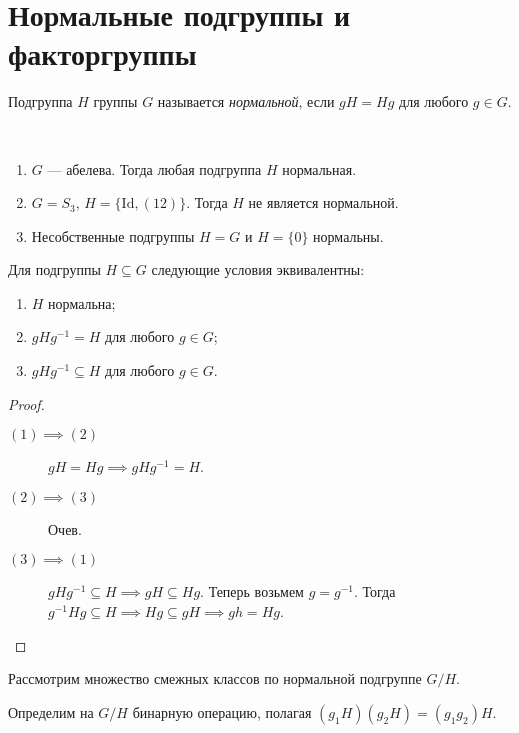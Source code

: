 \section{Нормальные подгруппы и факторгруппы}

\begin{definition}
    Подгруппа $H$ группы $G$ называется \textit{нормальной}, если $gH = Hg$ для любого $g \in G$.
\end{definition}

\begin{example}~
    \begin{enumerate}
    \item $G$ --- абелева. Тогда любая подгруппа $H$ нормальная.
    \item $G = S_3$, $H = \{\mathrm{Id}, (12)\}$. Тогда $H$ не является нормальной.
    \item Несобственные подгруппы $H = G$ и $H = \{0\}$ нормальны.
    \end{enumerate}
\end{example}

\begin{proposal}
    Для подгруппы $H \subseteq G$ следующие условия эквивалентны:
    \begin{enumerate}
    \item $H$ нормальна;
    \item $g H g^{-1} = H$ для любого $g \in G$;
    \item $g H g^{-1} \subseteq H$ для любого $g \in G$. 
    \end{enumerate}
\end{proposal}

\begin{proof}~
    \begin{description}
        \item[$(1) \implies (2)$] $gH = Hg \implies gHg^{-1} = H$.
        \item[$(2) \implies (3)$] Очев.
        \item[$(3) \implies (1)$] $gHg^{-1} \subseteq H \implies gH \subseteq Hg$. Теперь возьмем $g = g^{-1}$. Тогда $g^{-1} H g \subseteq H \implies Hg \subseteq gH \implies gh = Hg$.
            \qedhere
    \end{description}
\end{proof}

\bigskip
Рассмотрим множество смежных классов по нормальной подгруппе $G / H$.

Определим на $G / H$ бинарную операцию, полагая $(g_1 H)(g_2 H) = (g_1 g_2) H$.

